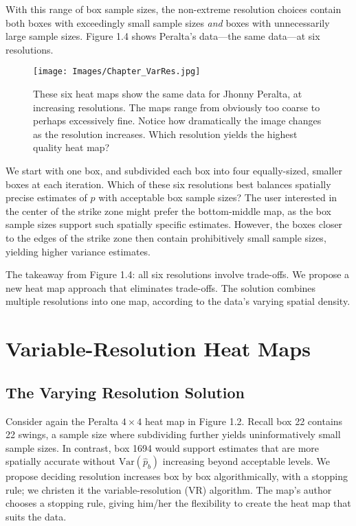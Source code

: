 With this range of box sample sizes, the non-extreme resolution choices contain both boxes with exceedingly small sample sizes {\it and} boxes with unnecessarily large sample sizes. Figure 1.4 shows Peralta's data---the same data---at six resolutions. 
        \begin{figure}[H]
      	\centering
      	\texttt{[image: Images/Chapter\_VarRes.jpg]} 
      	\caption{These six heat maps show the same data for Jhonny Peralta, at increasing resolutions. The maps range from obviously too coarse to perhaps excessively fine. Notice how dramatically the image changes as the resolution increases. Which resolution yields the highest quality heat map?}
      	\end{figure} 
We start with one box, and subdivided each box into four equally-sized, smaller boxes at each iteration. Which of these six resolutions best balances spatially precise estimates of $p$ with acceptable box sample sizes? The user interested in the center of the strike zone might prefer the bottom-middle map, as the box sample sizes support such spatially specific estimates. However, the boxes closer to the edges of the strike zone then contain prohibitively small sample sizes, yielding higher variance estimates. 

The takeaway from Figure 1.4: all six resolutions involve trade-offs. We propose a new heat map approach that eliminates trade-offs. The solution combines multiple resolutions into one map, according to the data's varying spatial density.

\section{Variable-Resolution Heat Maps} 

\subsection{The Varying Resolution Solution}

Consider again the Peralta $4 \times 4$ heat map in Figure 1.2. Recall box 22 contains 22 swings, a sample size where subdividing further yields uninformatively small sample sizes. In contrast, box 1694 would support estimates that are more spatially accurate without $\text{Var}(\hat{p}_{b})$ increasing beyond acceptable levels. We propose deciding resolution increases box by box algorithmically, with a stopping rule; we christen it the variable-resolution (VR) algorithm. The map's author chooses a stopping rule, giving him/her the flexibility to create the heat map that suits the data. 


